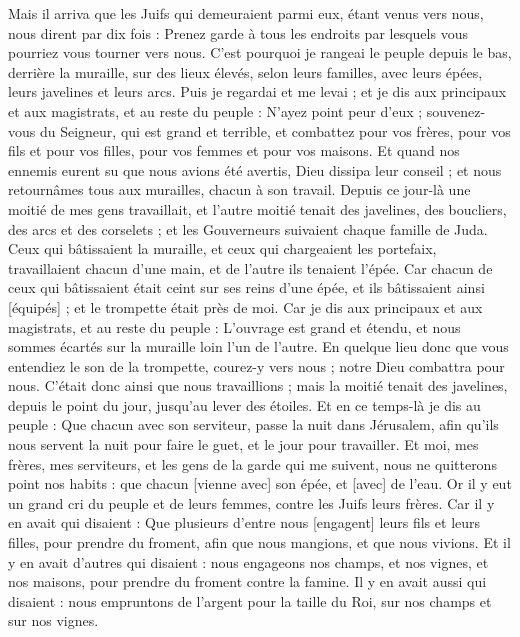 \begin{multicols}{2}
Mais il arriva que les Juifs qui demeuraient parmi eux, étant venus vers nous, nous dirent par dix fois : Prenez garde à tous les endroits par lesquels vous pourriez vous tourner vers nous.
C'est pourquoi je rangeai le peuple depuis le bas, derrière la muraille, sur des lieux élevés, selon leurs familles, avec leurs épées, leurs javelines et leurs arcs.
Puis je regardai et me levai ; et je dis aux principaux et aux magistrats, et au reste du peuple : N'ayez point peur d'eux ; souvenez-vous du Seigneur, qui est grand et terrible, et combattez pour vos frères, pour vos fils et pour vos filles, pour vos femmes et pour vos maisons.
Et quand nos ennemis eurent su que nous avions été avertis, Dieu dissipa leur conseil ; et nous retournâmes tous aux murailles, chacun à son travail.
Depuis ce jour-là une moitié de mes gens travaillait, et l'autre moitié tenait des javelines, des boucliers, des arcs et des corselets ; et les Gouverneurs suivaient chaque famille de Juda.
Ceux qui bâtissaient la muraille, et ceux qui chargeaient les portefaix, travaillaient chacun d'une main, et de l'autre ils tenaient l'épée.
Car chacun de ceux qui bâtissaient était ceint sur ses reins d'une épée, et ils bâtissaient ainsi [équipés] ; et le trompette était près de moi.
Car je dis aux principaux et aux magistrats, et au reste du peuple : L'ouvrage est grand et étendu, et nous sommes écartés sur la muraille loin l'un de l'autre.
En quelque lieu donc que vous entendiez le son de la trompette, courez-y vers nous ; notre Dieu combattra pour nous.
C'était donc ainsi que nous travaillions ; mais la moitié tenait des javelines, depuis le point du jour, jusqu'au lever des étoiles.
Et en ce temps-là je dis au peuple : Que chacun avec son serviteur, passe la nuit dans Jérusalem, afin qu'ils nous servent la nuit pour faire le guet, et le jour pour travailler.
Et moi, mes frères, mes serviteurs, et les gens de la garde qui me suivent, nous ne quitterons point nos habits : que chacun [vienne avec] son épée, et [avec] de l'eau.
\VerseOne{}Or il y eut un grand cri du peuple et de leurs femmes, contre les Juifs leurs frères.
Car il y en avait qui disaient : Que plusieurs d'entre nous [engagent] leurs fils et leurs filles, pour prendre du froment, afin que nous mangions, et que nous vivions.
Et il y en avait d'autres qui disaient : nous engageons nos champs, et nos vignes, et nos maisons, pour prendre du froment contre la famine.
Il y en avait aussi qui disaient : nous empruntons de l'argent pour la taille du Roi, sur nos champs et sur nos vignes.

\end{multicols}

